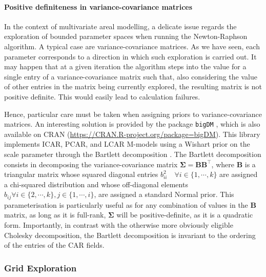 \documentclass[openany, 11pt, oneside]{book}
\begin{document}
\paragraph{Positive definiteness in variance-covariance matrices}

In the context of multivariate areal modelling, a delicate issue regards the exploration of bounded parameter spaces when running the Newton-Raphson algorithm. A typical case are variance-covariance matrices. As we have seen, each parameter corresponds to a direction in which such exploration is carried out. It may happen that at a given iteration the algorithm steps into the value for a single entry of a variance-covariance matrix such that, also considering the value of other entries in the matrix being currently explored, the resulting matrix is not positive definite. This would easily lead to calculation failures. 

Hence, particular care must be taken when assigning priors to variance-covariance matrices. An interesting solution is provided by the package \texttt{bigDM} \parencite{Vicente2023}, which is also available on CRAN (\url{https://CRAN.R-project.org/package=bigDM}). This library implements ICAR, PCAR, and LCAR M-models using a Wishart prior on the scale parameter through the Bartlett decomposition \parencite{Kabe}. The Bartlett decomposition consists in decomposing the variance-covariance matrix $\boldsymbol{\Sigma} = \boldsymbol{B B^\top}$, where $\boldsymbol{B}$ is a triangular matrix whose squared diagonal entries $b_{ii}^2\quad \forall i \in \lbrace 1, \cdots, k\rbrace$ are assigned a chi-squared distribution and whose off-diagonal elements $b_{ij} \forall i \in \lbrace2, \cdots,  k \rbrace, j\in \lbrace 1, \cdots, i\rbrace$, are assigned a standard Normal prior. This parameterisation is particularly useful as for any combination of values in the $\boldsymbol{B}$ matrix, as long as it is full-rank, $\boldsymbol{\Sigma}$ will be positive-definite, as it is a quadratic form. Importantly, in contrast with the otherwise more obviously eligible Cholesky decomposition, the Bartlett decomposition is invariant to the ordering of the entries of the CAR fields. 


\subsubsection{Grid Exploration}
\end{document}
